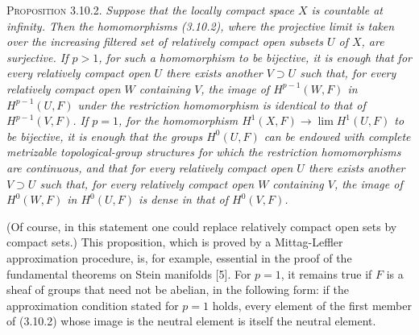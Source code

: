 \textsc{Proposition 3.10.2.} \textit{Suppose that the locally compact
space $X$ is countable at infinity. Then the homomorphisms \textup{(3.10.2)}, where the
projective limit is taken over the increasing filtered set of relatively compact
open subsets $U$ of $X$, are surjective. If $p>1$, for such a homomorphism to
be bijective, it is enough that for every relatively compact open $U$ there
exists another $V\supset U$ such that, for every relatively compact open $W$
containing $V$, the image of $H^{p-1}(W,F)$ in $H^{p-1}(U,F)$ under the
restriction homomorphism is identical to that of $H^{p-1}(V,F)$. If $p=1$,
for the homomorphism $H^1(X,F)\to\lim H^1(U,F)$ to be
bijective, it is enough that the groups $H^0(U,F)$ can be endowed with
complete metrizable topological-group structures for which the restriction
homomorphisms are continuous, and that for every relatively compact open $U$
there exists another $V\supset U$ such that, for every relatively compact open
$W$ containing $V$, the image of $H^0(W,F)$ in $H^0(U,F)$ is dense in that of
$H^0(V,F)$.}

(Of course, in this statement one could replace relatively compact open sets
by compact sets.) This proposition, which is proved by a Mittag-Leffler
approximation procedure, is, for example, essential in the proof of the
fundamental theorems on Stein manifolds [5]. For $p=1$, it remains true if $F$
is a sheaf of groups that need not be abelian, in the following form: if the
approximation condition stated for $p=1$ holds, every element of the first
member of (3.10.2) whose image is the neutral element is itself the neutral
element.

